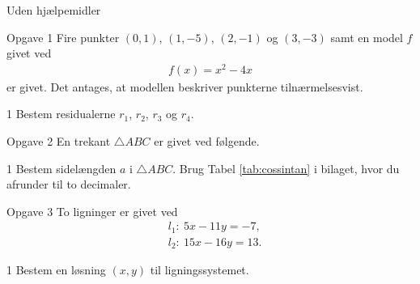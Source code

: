 \begin{center}
	\LARGE
	Uden hjælpemidler
\end{center}
\begin{opgavetekst}{Opgave 1}
	Fire punkter $(0,1)$, $(1,-5)$, $(2,-1)$ og $(3,-3)$ samt en model $f$ givet ved
	\begin{align*}
		f(x) = x^2 - 4x
	\end{align*}
	er givet. Det antages, at modellen beskriver punkterne tilnærmelsesvist. 
\end{opgavetekst}
\begin{delopgave}{1}
	Bestem residualerne $r_1$, $r_2$, $r_3$ og $r_4$.
\end{delopgave}
%
%
%
%
%
%
\begin{opgavetekst}{Opgave 2}
	En trekant $\triangle ABC$ er givet ved følgende. 
	\begin{center}
	\end{center}
	\phantom{h}
\end{opgavetekst}
\begin{delopgave}{1}
	Bestem sidelængden $a$ i $\triangle ABC$. Brug Tabel \ref{tab:cossintan} i bilaget, hvor du afrunder til 
	to decimaler. 
\end{delopgave}
%
%
%
%
%
\begin{opgavetekst}{Opgave 3}
	To ligninger er givet ved
	\begin{align*}
		&l_1:\ 5x-11y = -7, \\
		&l_2:\ 15x-16y = 13.
	\end{align*}
\end{opgavetekst}
\begin{delopgave}{1}
	Bestem en løsning $(x,y)$ til ligningssystemet. 
\end{delopgave}


